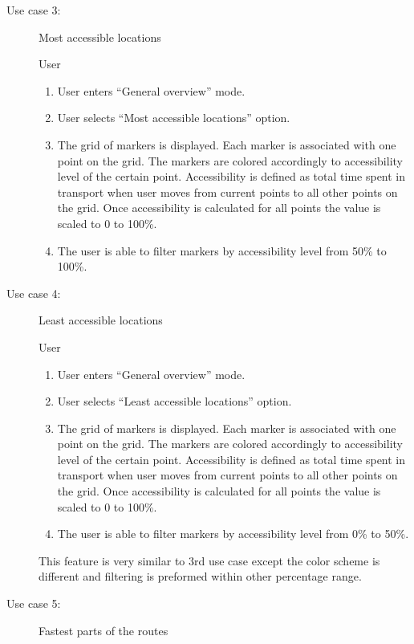 \begin{description}
  \item[Use case 3:] Most accessible locations

  \underline{} User

  \underline{}
  \begin{enumerate}
    \item User enters ``General overview'' mode.
    \item User selects ``Most accessible locations'' option.
    \item The grid of markers is displayed. Each marker is associated with one
    point on the grid. The markers are colored accordingly to accessibility level of the
    certain point. Accessibility is defined as total time spent in transport when user
    moves from current points to all other points on the grid. Once accessibility
    is calculated for all points the value is scaled to 0 to 100\%.
    \item The user is able to filter markers by accessibility level from 50\% to 100\%.
  \end{enumerate}

  \item[Use case 4:] Least accessible locations

  \underline{} User

  \underline{}
  \begin{enumerate}
    \item User enters ``General overview'' mode.
    \item User selects ``Least accessible locations'' option.
    \item The grid of markers is displayed. Each marker is associated with one
    point on the grid. The markers are colored accordingly to accessibility level of the
    certain point. Accessibility is defined as total time spent in transport when user
    moves from current points to all other points on the grid. Once accessibility
    is calculated for all points the value is scaled to 0 to 100\%.
    \item The user is able to filter markers by accessibility level from 0\% to 50\%.
  \end{enumerate}

  \underline{} This feature is very similar to 3rd use case except
  the color scheme is different and filtering is preformed within other percentage range.

  \item[Use case 5:] Fastest parts of the routes


\end{description}
